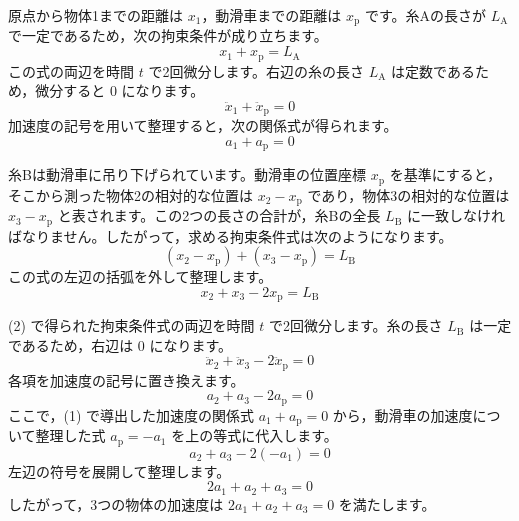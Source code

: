 \solutionheading
\begin{solutionparts}

原点から物体1までの距離は $x_1$，動滑車までの距離は $x_{\text{p}}$ です。糸Aの長さが $L_{\text{A}}$ で一定であるため，次の拘束条件が成り立ちます。
\begin{equation*}
x_1 + x_{\text{p}} = L_{\text{A}}
\end{equation*}
この式の両辺を時間 $t$ で2回微分します。右辺の糸の長さ $L_{\text{A}}$ は定数であるため，微分すると 0 になります。
\begin{equation*}
\ddot{x}_1 + \ddot{x}_{\text{p}} = 0
\end{equation*}
加速度の記号を用いて整理すると，次の関係式が得られます。
\begin{equation*}
a_1 + a_{\text{p}} = 0
\end{equation*}

糸Bは動滑車に吊り下げられています。動滑車の位置座標 $x_{\text{p}}$ を基準にすると，そこから測った物体2の相対的な位置は $x_2 - x_{\text{p}}$ であり，物体3の相対的な位置は $x_3 - x_{\text{p}}$ と表されます。この2つの長さの合計が，糸Bの全長 $L_{\text{B}}$ に一致しなければなりません。したがって，求める拘束条件式は次のようになります。
\begin{equation*}
(x_2 - x_{\text{p}}) + (x_3 - x_{\text{p}}) = L_{\text{B}}
\end{equation*}
この式の左辺の括弧を外して整理します。
\begin{equation*}
x_2 + x_3 - 2x_{\text{p}} = L_{\text{B}}
\end{equation*}

(2) で得られた拘束条件式の両辺を時間 $t$ で2回微分します。糸の長さ $L_{\text{B}}$ は一定であるため，右辺は 0 になります。
\begin{equation*}
\ddot{x}_2 + \ddot{x}_3 - 2\ddot{x}_{\text{p}} = 0
\end{equation*}
各項を加速度の記号に置き換えます。
\begin{equation*}
a_2 + a_3 - 2a_{\text{p}} = 0
\end{equation*}
ここで，(1) で導出した加速度の関係式 $a_1 + a_{\text{p}} = 0$ から，動滑車の加速度について整理した式 $a_{\text{p}} = -a_1$ を上の等式に代入します。
\begin{equation*}
a_2 + a_3 - 2(-a_1) = 0
\end{equation*}
左辺の符号を展開して整理します。
\begin{equation*}
2a_1 + a_2 + a_3 = 0
\end{equation*}
したがって，3つの物体の加速度は $2a_1+a_2+a_3=0$ を満たします。

\end{solutionparts}
